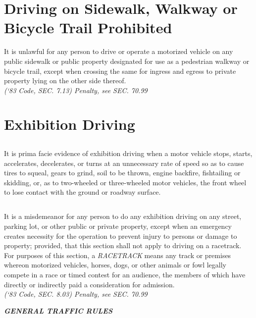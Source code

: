 \section{Driving on Sidewalk, Walkway or Bicycle Trail Prohibited}
It is unlawful for any person to drive or operate a motorized vehicle on any public sidewalk or public property designated for use as a pedestrian walkway or bicycle trail, except when crossing the same for ingress and egress to private property lying on the other side thereof.\\
\emph{(‘83 Code, SEC. 7.13) Penalty, see SEC. 70.99}
\section{Exhibition Driving}
\subsection{}
It is prima facie evidence of exhibition driving when a motor vehicle stops, starts, accelerates, decelerates, or turns at an unnecessary rate of speed so as to cause tires to squeal, gears to grind, soil to be thrown, engine backfire, fishtailing or skidding, or, as to two-wheeled or three-wheeled motor vehicles, the front wheel to lose contact with the ground or roadway surface.
\subsection{}
It is a misdemeanor for any person to do any exhibition driving on any street, parking lot, or other public or private property, except when an emergency creates necessity for the operation to prevent injury to persons or damage to property; provided, that this section shall not apply to driving on a racetrack.  For purposes of this section, a \emph{RACETRACK} means any track or premises whereon motorized vehicles, horses, dogs, or other animals or fowl legally compete in a race or timed contest for an audience, the members of which have directly or indirectly paid a consideration for admission.\\
\emph{(‘83 Code, SEC. 8.03) Penalty, see SEC. 70.99}\\

\begin{center}
\emph{\textbf{\LARGE{GENERAL TRAFFIC RULES}}}
\end{center}
\setcounter{section}{14}
